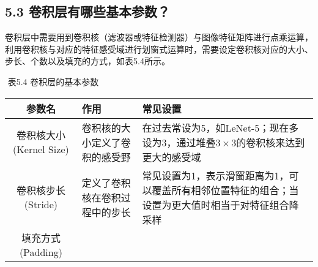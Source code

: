 \subsection{5.3
卷积层有哪些基本参数？}\label{ux5377ux79efux5c42ux6709ux54eaux4e9bux57faux672cux53c2ux6570}

​
卷积层中需要用到卷积核（滤波器或特征检测器）与图像特征矩阵进行点乘运算，利用卷积核与对应的特征感受域进行划窗式运算时，需要设定卷积核对应的大小、步长、个数以及填充的方式，如表5.4所示。

​ 表5.4 卷积层的基本参数

\begin{longtable}[]{ cll }
\toprule
\begin{minipage}[b]{0.16\columnwidth}\centering\strut
参数名\strut
\end{minipage} & \begin{minipage}[b]{0.38\columnwidth}\raggedright\strut
作用\strut
\end{minipage} & \begin{minipage}[b]{0.38\columnwidth}\raggedright\strut
常见设置\strut
\end{minipage}\tabularnewline
\midrule
\endhead
\begin{minipage}[t]{0.16\columnwidth}\centering\strut
卷积核大小 (Kernel Size)\strut
\end{minipage} & \begin{minipage}[t]{0.38\columnwidth}\raggedright\strut
卷积核的大小定义了卷积的感受野\strut
\end{minipage} & \begin{minipage}[t]{0.38\columnwidth}\raggedright\strut
在过去常设为5，如LeNet-5；现在多设为3，通过堆叠\(3\times3\)的卷积核来达到更大的感受域\strut
\end{minipage}\tabularnewline
\begin{minipage}[t]{0.16\columnwidth}\centering\strut
卷积核步长 (Stride)\strut
\end{minipage} & \begin{minipage}[t]{0.38\columnwidth}\raggedright\strut
定义了卷积核在卷积过程中的步长\strut
\end{minipage} & \begin{minipage}[t]{0.38\columnwidth}\raggedright\strut
常见设置为1，表示滑窗距离为1，可以覆盖所有相邻位置特征的组合；当设置为更大值时相当于对特征组合降采样\strut
\end{minipage}\tabularnewline
\begin{minipage}[t]{0.16\columnwidth}\centering\strut
填充方式 (Padding)\strut
\end{minipage} & \begin{minipage}[t]{0.38\columnwidth}\raggedright\strut

\end{minipage}
\end{longtable}
